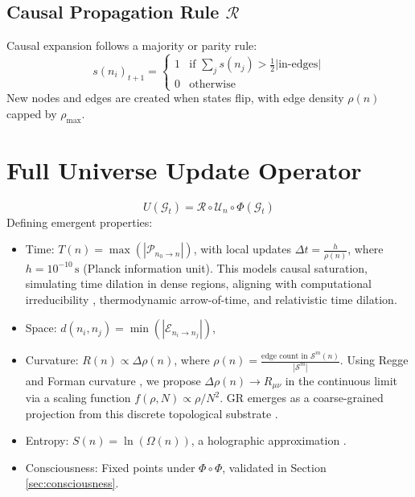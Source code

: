 \documentclass[11pt]{article}
\begin{document}
\subsection{Causal Propagation Rule \( \mathcal{R} \)}
Causal expansion follows a majority or parity rule:
\begin{equation}
    s(n_i)_{t+1} = \begin{cases} 
        1 & \text{if } \sum_{j} s(n_j) > \frac{1}{2}|\text{in-edges}| \\ 
        0 & \text{otherwise} 
    \end{cases}
\end{equation}
New nodes and edges are created when states flip, with edge density \( \rho(n) \) capped by \( \rho_{\text{max}} \).

\section{Full Universe Update Operator}
\begin{equation}
    U(\mathcal{G}_t) = \mathcal{R} \circ \mathcal{U}_n \circ \Phi(\mathcal{G}_t)
\end{equation}
Defining emergent properties:
\begin{itemize}
    \item Time: \( T(n) = \max(|\mathcal{P}_{n_0 \rightarrow n}|) \), with local updates \( \Delta t = \frac{h}{\rho(n)} \), where \( h = 10^{-10} \, \text{s} \) (Planck information unit). This models causal saturation, simulating time dilation in dense regions, aligning with computational irreducibility \citep{wolfram}, thermodynamic arrow-of-time, and relativistic time dilation.
    \item Space: \( d(n_i, n_j) = \min(|\mathcal{E}_{n_i \rightarrow n_j}|) \),
    \item Curvature: \( R(n) \propto \Delta \rho(n) \), where \( \rho(n) = \frac{\text{edge count in } \mathcal{S}^m(n)}{|\mathcal{S}^m|} \). Using Regge and Forman curvature \citep{regge, forman}, we propose \( \Delta \rho(n) \to R_{\mu\nu} \) in the continuous limit via a scaling function \( f(\rho, N) \propto \rho / N^2 \). GR emerges as a coarse-grained projection from this discrete topological substrate \citep{verlinde}.
    \item Entropy: \( S(n) = \ln(\Omega(n)) \), a holographic approximation \citep{ryu}.
    \item Consciousness: Fixed points under \( \Phi \circ \Phi \), validated in Section \ref{sec:consciousness}.
\end{itemize}
\end{document}
